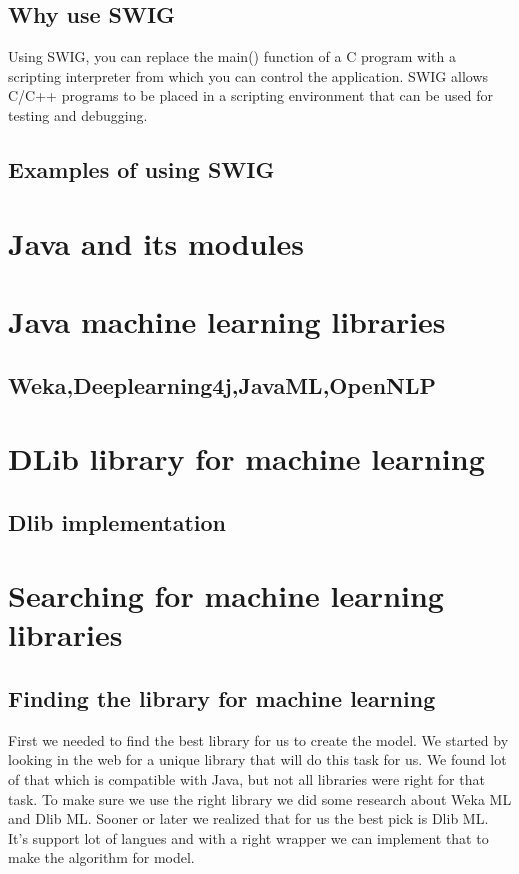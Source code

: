 \documentclass[english,12pt,oneside,a4paper]{article}
\begin{document}
\begin{center}
		\subsection{Why use SWIG}
		Using SWIG, you can replace the main() function of a C program with a scripting interpreter from which you can control the application. SWIG allows C/C++ programs to be placed in a scripting environment that can be used for testing and debugging.
		\subsection{Examples of using SWIG}
		
		\section{Java and its modules}
		
		\section{Java machine learning libraries}
		
		\subsection{Weka,Deeplearning4j,JavaML,OpenNLP}
		
		\section{DLib library for machine learning}
		
		\subsection{Dlib implementation}
		
		\section{Searching for machine learning libraries}
		
		\subsection{Finding the library for machine learning}
		First we needed to find the best library for us to create the model.
		We started by looking in the web for a unique library that will do this task for us. We found lot of that which is compatible with Java, but not all libraries were right for that task. To make sure we use the right library we did some research about Weka ML and Dlib ML.
		Sooner or later we realized that for us the best pick is Dlib ML. It's support lot of langues and with a right wrapper we can implement that to make the algorithm for model.

\end{center}
\end{document}
